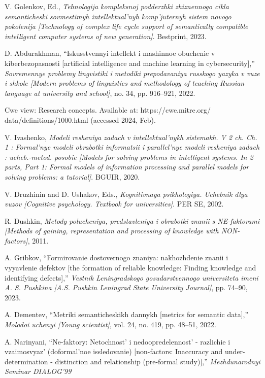 \documentclass{article}
\begin{document}
\begin{multicols}{2}
\begin{enumerate}[label=\text{[\arabic*]}, noitemsep,topsep=1.5pt,parsep=1.5pt,partopsep=1.5pt]
\item V. Golenkov, Ed., \textit{Tehnologija kompleksnoj podderzhki
zhiznennogo cikla semanticheski sovmestimyh intellektual’nyh
komp’juternyh sistem novogo pokolenija [Technology of complex
life cycle support of semantically compatible intelligent computer
systems of new generation]}. Bestprint, 2023.
\item D. Abdurakhman, “Iskusstvennyi intellekt i mashinnoe obuchenie
v kiberbezopasnosti [artificial intelligence and machine learning
in cybersecurity],” \textit{Sovremennye problemy lingvistiki i metodiki
prepodavaniya russkogo yazyka v vuze i shkole [Modern problems
of linguistics and methodology of teaching Russian language at
university and school]}, no. 34, pp. 916–921, 2022.
\item Cwe view: Research concepts. Available at: https://cwe.mitre.org/
data/definitions/1000.html (accessed 2024, Feb).
\item V. Ivashenko, \textit{Modeli resheniya zadach v intellektual’nykh
sistemakh. V 2 ch. Ch. 1 : Formal’nye modeli obrabotki
informatsii i parallel’nye modeli resheniya zadach : ucheb.-metod.
posobie [Models for solving problems in intelligent systems. In
2 parts, Part 1: Formal models of information processing and
parallel models for solving problems: a tutorial]}. BGUIR, 2020.
\item V. Druzhinin and D. Ushakov, Eds., \textit{Kognitivnaya psikhologiya.
Uchebnik dlya vuzov [Cognitive psychology. Textbook for
universities]}. PER SE, 2002.
\item R. Dushkin, \textit{Metody polucheniya, predstavleniya i obrabotki
znanii s NE-faktorami [Methods of gaining, representation and
processing of knowledge with NON-factors]}, 2011.
\item A. Gribkov, “Formirovanie dostovernogo znaniya: nakhozhdenie
znanii i vyyavlenie defektov [the formation of reliable
knowledge: Finding knowledge and identifying defects],” \textit{Vestnik
Leningradskogo gosudarstvennogo universiteta imeni A. S.
Pushkina [A.S. Pushkin Leningrad State University Journal]}, pp.
74–90, 2023.
\item A. Dementev, “Metriki semanticheskikh dannykh [metrics for
semantic data],” \textit{Molodoi uchenyi [Young scientist]}, vol. 24, no.
419, pp. 48–51, 2022.
\item A. Narinyani, “Ne-faktory: Netochnost’ i nedoopredelennost’ -
razlichie i vzaimosvyaz’ (doformal’noe issledovanie) [non-factors:
Inaccuracy and under-determination - distinction and relationship
(pre-formal study)],” \textit{Mezhdunarodnyi Seminar DIALOG’99
}
\end{enumerate}
\end{multicols}
\end{document}

